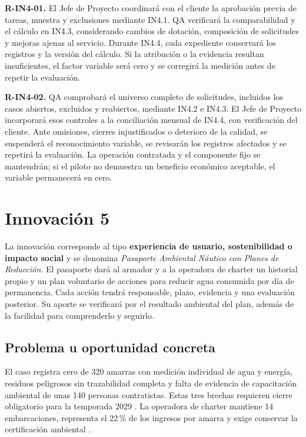 \medskip
\noindent\textbf{R-IN4-01.}
El Jefe de Proyecto coordinará con el cliente la aprobación previa
de tareas, muestra y exclusiones mediante IN4.1. QA verificará la
comparabilidad y el cálculo en IN4.3, considerando cambios de dotación,
composición de solicitudes y mejoras ajenas al servicio. Durante IN4.4,
cada expediente conservará los registros y la versión del cálculo.
Si la atribución o la evidencia resultan insuficientes, el factor
variable será cero y se corregirá la medición antes de repetir
la evaluación.

\medskip
\noindent\textbf{R-IN4-02.}
QA comprobará el universo completo de solicitudes, incluidos los
casos abiertos, excluidos y reabiertos, mediante IN4.2 e IN4.3.
El Jefe de Proyecto incorporará esos controles a la conciliación
mensual de IN4.4, con verificación del cliente. Ante omisiones,
cierres injustificados o deterioro de la calidad, se suspenderá
el reconocimiento variable, se revisarán los registros afectados
y se repetirá la evaluación. La operación contratada y el componente
fijo se mantendrán; si el piloto no demuestra un beneficio económico
aceptable, el variable permanecerá en cero.

\section{Innovación 5}

La innovación corresponde al tipo \textbf{experiencia de usuario, sostenibilidad o impacto social} y se denomina \textit{Pasaporte Ambiental Náutico con Planes de Reducción}. El pasaporte dará al armador y a la operadora de charter un historial propio y un plan voluntario de acciones para reducir agua consumida por día de permanencia. Cada acción tendrá responsable, plazo, evidencia y una evaluación posterior. Su aporte se verificará por el resultado ambiental del plan, además de la facilidad para comprenderlo y seguirlo.

\subsection{Problema u oportunidad concreta}

El caso registra cero de 320 amarras con medición individual de agua y energía, residuos peligrosos sin trazabilidad completa y falta de evidencia de capacitación ambiental de unas 140 personas contratistas. Estas tres brechas requieren cierre obligatorio para la temporada 2029 \parencite[secs.~7.3 y 9.8 y caps.~11 y 13]{caso07}. La operadora de charter mantiene 14 embarcaciones, representa el 22\,\% de los ingresos por amarra y exige conservar la certificación ambiental \parencite[caps.~1 y 8]{caso07}.

